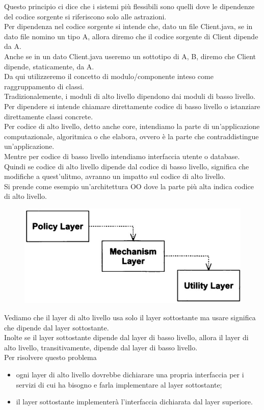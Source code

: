 Questo principio ci dice che i sistemi più flessibili sono quelli dove le dipendenze del codice sorgente si riferiscono solo alle astrazioni.\\
Per dipendenza nel codice sorgente si intende che, dato un file Client.java, se in dato file nomino un tipo A, allora diremo che il codice sorgente di Client dipende da A.\\
Anche se in un dato Client.java useremo un sottotipo di A, B, diremo che Client dipende, staticamente, da A.\\
Da qui utilizzeremo il concetto di modulo/componente inteso come raggruppamento di classi.\\
Tradizionalemente, i moduli di alto livello dipendono dai moduli di basso livello.\\
Per dipendere si intende chiamare direttamente codice di basso livello o istanziare direttamente classi concrete.\\
Per codice di alto livello, detto anche core, intendiamo la parte di un'applicazione computazionale, algoritmica o che elabora, ovvero è la parte che contraddistingue un'applicazione.\\
Mentre per codice di basso livello intendiamo interfaccia utente o database.\\
Quindi se codice di alto livello dipende dal codice di basso livello, significa che modifiche a quest'ulitmo, avranno un impatto sul codice di alto livello.\\
Si prende come esempio un'architettura OO dove la parte più alta indica codice di alto livello.\\
\begin{figure}
  \includegraphics[width=0.5\linewidth]{../../immagini/principio_SOLID/architetturaOOnoDIP}  
\end{figure}

Vediamo che il layer di alto livello usa solo il layer sottostante ma usare significa che dipende dal layer sottostante.\\
Inolte se il layer sottostante dipende dal layer di basso livello, allora il layer di alto livello, transitivamente, dipende dal layer di basso livello.\\
Per risolvere questo problema
\begin{itemize}
  \item ogni layer di alto livello dovrebbe dichiarare una propria interfaccia per i servizi di cui ha bisogno e farla implementare al layer sottostante;
  \item il layer sottostante implementerà l'interfaccia dichiarata dal layer superiore.
\end{itemize}

